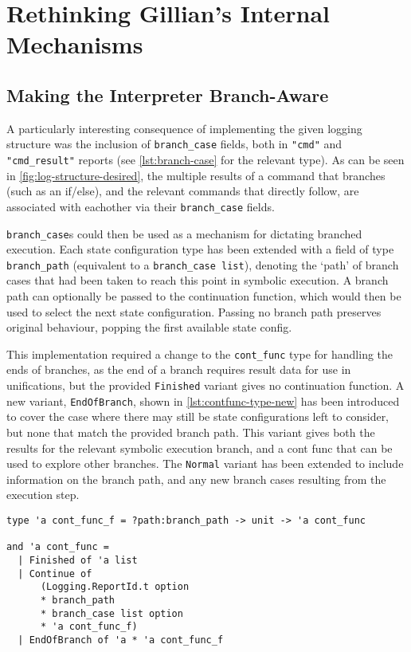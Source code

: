 
\section{Rethinking Gillian's Internal Mechanisms}

\subsection{Making the Interpreter Branch-Aware}%
\label{sec:interpreter-branching}

A particularly interesting consequence of implementing the given logging
structure was the inclusion of \texttt{branch\_case} fields, both in
\texttt{"cmd"} and \texttt{"cmd\_result"} reports (see \autoref{lst:branch-case}
for the relevant type). As can be seen in \autoref{fig:log-structure-desired},
the multiple results of a command that branches (such as an if/else), and the
relevant commands that directly follow, are associated with eachother via their
\texttt{branch\_case} fields.

\texttt{branch\_case}s could then be used as a mechanism for dictating branched
execution. Each state configuration type has been extended with a field of type
\texttt{branch\_path} (equivalent to a \texttt{branch\_case list}),  denoting
the `path' of branch cases that had been taken to reach this point in symbolic
execution. A branch path can optionally be passed to the continuation function,
which would then be used to select the next state configuration. Passing no
branch path preserves original behaviour, popping the first available state
config.

This implementation required a change to the \texttt{cont\_func} type for
handling the ends of branches, as the end of a branch requires result data for
use in unifications, but the provided \texttt{Finished} variant gives no
continuation function. A new variant, \texttt{EndOfBranch}, shown in
\autoref{lst:contfunc-type-new} has been introduced to cover the case where
there may still be state configurations left to consider, but none that match
the provided branch path. This variant gives both the results for the relevant
symbolic execution branch, and a cont func that can be used to explore other
branches. The \texttt{Normal} variant has been extended to include information
on the branch path, and any new branch cases resulting from the execution step.

\begin{lstlisting}[caption={
  The new \texttt{cont\_func} type, in the \texttt{GInterpreter} module
  \label{lst:contfunc-type-new}}, style=code, numbers=none]
type 'a cont_func_f = ?path:branch_path -> unit -> 'a cont_func

and 'a cont_func =
  | Finished of 'a list
  | Continue of
      (Logging.ReportId.t option
      * branch_path
      * branch_case list option
      * 'a cont_func_f)
  | EndOfBranch of 'a * 'a cont_func_f
\end{lstlisting}


